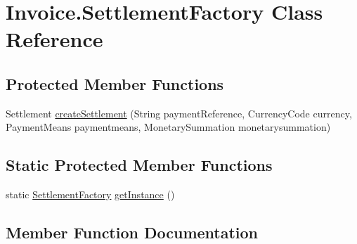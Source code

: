 \hypertarget{class_invoice_1_1_settlement_factory}{}\section{Invoice.\+Settlement\+Factory Class Reference}
\label{class_invoice_1_1_settlement_factory}
\subsection*{Protected Member Functions}
\begin{DoxyCompactItemize}
\item 
Settlement \hyperlink{class_invoice_1_1_settlement_factory_af06ce3b2305ed105af1aad351bb260b3}{create\+Settlement} (String payment\+Reference, Currency\+Code currency, Payment\+Means paymentmeans, Monetary\+Summation monetarysummation)
\end{DoxyCompactItemize}
\subsection*{Static Protected Member Functions}
\begin{DoxyCompactItemize}
\item 
static \hyperlink{class_invoice_1_1_settlement_factory}{Settlement\+Factory} \hyperlink{class_invoice_1_1_settlement_factory_a9c0bde8197b4ecc3642af925fe5f7d3a}{get\+Instance} ()
\end{DoxyCompactItemize}


\subsection{Member Function Documentation}
